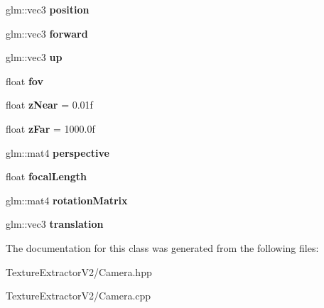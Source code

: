 \begin{DoxyCompactItemize}
\item 
\hypertarget{class_camera_a04b5db2c530d8630660e8cfb93a4b3b5}{}glm\+::vec3 {\bfseries position}\label{class_camera_a04b5db2c530d8630660e8cfb93a4b3b5}

\item 
\hypertarget{class_camera_aa98ee9f3a770f03ebca0cde9f7b8ab50}{}glm\+::vec3 {\bfseries forward}\label{class_camera_aa98ee9f3a770f03ebca0cde9f7b8ab50}

\item 
\hypertarget{class_camera_a3fe5f351380fb118ffc600591769f049}{}glm\+::vec3 {\bfseries up}\label{class_camera_a3fe5f351380fb118ffc600591769f049}

\item 
\hypertarget{class_camera_aff7393c9cfbccd7e369091f00008da93}{}float {\bfseries fov}\label{class_camera_aff7393c9cfbccd7e369091f00008da93}

\item 
\hypertarget{class_camera_a1db2166635ff27594eda3a23130b66ac}{}float {\bfseries z\+Near} = 0.\+01f\label{class_camera_a1db2166635ff27594eda3a23130b66ac}

\item 
\hypertarget{class_camera_a6290469f972a5903c805725db563f41f}{}float {\bfseries z\+Far} = 1000.\+0f\label{class_camera_a6290469f972a5903c805725db563f41f}

\item 
\hypertarget{class_camera_ac4c1ee3074b5e4b70efec7d3ceb1467f}{}glm\+::mat4 {\bfseries perspective}\label{class_camera_ac4c1ee3074b5e4b70efec7d3ceb1467f}

\item 
\hypertarget{class_camera_a0375653f2ef532ac566eba093c2c922d}{}float {\bfseries focal\+Length}\label{class_camera_a0375653f2ef532ac566eba093c2c922d}

\item 
\hypertarget{class_camera_a0986d4d426737e26178056e3635dc3d8}{}glm\+::mat4 {\bfseries rotation\+Matrix}\label{class_camera_a0986d4d426737e26178056e3635dc3d8}

\item 
\hypertarget{class_camera_ab7dbba19077d1457c557c31a215c2557}{}glm\+::vec3 {\bfseries translation}\label{class_camera_ab7dbba19077d1457c557c31a215c2557}

\end{DoxyCompactItemize}


The documentation for this class was generated from the following files\+:\begin{DoxyCompactItemize}
\item 
Texture\+Extractor\+V2/Camera.\+hpp\item 
Texture\+Extractor\+V2/Camera.\+cpp\end{DoxyCompactItemize}
